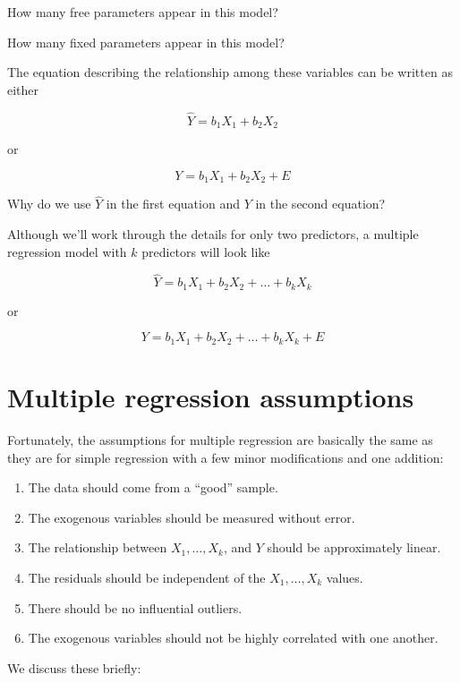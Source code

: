 \documentclass[
]{book}
\providecommand{\tightlist}{%
  \setlength{\itemsep}{0pt}\setlength{\parskip}{0pt}}
\begin{document}
How many free parameters appear in this model?

How many fixed parameters appear in this model?

The equation describing the relationship among these variables can be written as either

\[
\hat{Y} = b_{1}X_{1} + b_{2}X_{2}
\]

or

\[
Y = b_{1}X_{1} + b_{2}X_{2} + E
\]

Why do we use \(\hat{Y}\) in the first equation and \(Y\) in the second equation?

Although we'll work through the details for only two predictors, a multiple regression model with \(k\) predictors will look like

\[
\hat{Y} = b_{1}X_{1} + b_{2}X_{2} + \dots + b_{k}X_{k}
\]

or

\[
Y = b_{1}X_{1} + b_{2}X_{2}  + \dots + b_{k}X_{k} + E
\]

\hypertarget{multiple-assumptions}{%
\section{Multiple regression assumptions}\label{multiple-assumptions}}

Fortunately, the assumptions for multiple regression are basically the same as they are for simple regression with a few minor modifications and one addition:

\begin{enumerate}
\def\labelenumi{\arabic{enumi}.}
\tightlist
\item
  The data should come from a ``good'' sample.
\item
  The exogenous variables should be measured without error.
\item
  The relationship between \(X_{1}, \dots, X_{k}\), and \(Y\) should be approximately linear.
\item
  The residuals should be independent of the \(X_{1}, \dots, X_{k}\) values.
\item
  There should be no influential outliers.
\item
  The exogenous variables should not be highly correlated with one another.
\end{enumerate}

We discuss these briefly:
\end{document}
